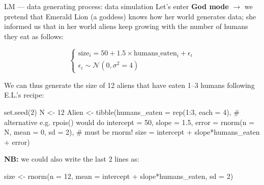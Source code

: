 \documentclass[
  10pt,
  ignorenonframetext,
  aspectratio=169,
  t]{beamer}
\newenvironment{Shaded}{\begin{snugshade}}{\end{snugshade}}
\newcommand{\AttributeTok}[1]{\textcolor[rgb]{0.40,0.45,0.13}{#1}}
\newcommand{\CommentTok}[1]{\textcolor[rgb]{0.37,0.37,0.37}{#1}}
\newcommand{\DecValTok}[1]{\textcolor[rgb]{0.68,0.00,0.00}{#1}}
\newcommand{\FloatTok}[1]{\textcolor[rgb]{0.68,0.00,0.00}{#1}}
\newcommand{\FunctionTok}[1]{\textcolor[rgb]{0.28,0.35,0.67}{#1}}
\newcommand{\NormalTok}[1]{\textcolor[rgb]{0.00,0.23,0.31}{#1}}
\newcommand{\OtherTok}[1]{\textcolor[rgb]{0.00,0.23,0.31}{#1}}
\newcommand{\SpecialCharTok}[1]{\textcolor[rgb]{0.37,0.37,0.37}{#1}}
\newcommand{\bluenorm}[1]{\textcolor{bluebeamer}{#1}}
\newcommand{\bluebold}[1]{\textcolor{bluebeamer}{\textbf{#1}}}
\begin{document}
\begin{frame}[fragile]{LM --- data generating process: data simulation}
\protect{}\label{lm-data-generating-process-data-simulation}
Let's enter \bluebold{God mode} \(\rightarrow\) we pretend that
\bluenorm{Emerald Lion} (a goddess) knows how her world generates data;
she informed us that in her world aliens keep growing with the number of
humans they eat as follows:

\begin{equation*}
\begin{cases}
\text{size}_i = 50 + 1.5 \times \text{humans\_eaten}_{i} + \epsilon_i \\
\epsilon_i \sim \mathcal{N}(0, \sigma^2 = 4)
\end{cases}
\end{equation*}

\pause

We can thus generate the size of 12 aliens that have eaten 1--3 humans
following E.L.'s recipe:

\footnotesize

\begin{Shaded}
\begin{Highlighting}[]
\FunctionTok{set.seed}\NormalTok{(}\DecValTok{2}\NormalTok{)}
\NormalTok{N }\OtherTok{\textless{}{-}} \DecValTok{12}
\NormalTok{Alien }\OtherTok{\textless{}{-}} \FunctionTok{tibble}\NormalTok{(}\AttributeTok{humans\_eaten =} \FunctionTok{rep}\NormalTok{(}\DecValTok{1}\SpecialCharTok{:}\DecValTok{3}\NormalTok{, }\AttributeTok{each =} \DecValTok{4}\NormalTok{), }\CommentTok{\# alternative e.g. rpois() would do }
                \AttributeTok{intercept =} \DecValTok{50}\NormalTok{, }\AttributeTok{slope =} \FloatTok{1.5}\NormalTok{,}
                \AttributeTok{error =} \FunctionTok{rnorm}\NormalTok{(}\AttributeTok{n =}\NormalTok{ N, }\AttributeTok{mean =} \DecValTok{0}\NormalTok{, }\AttributeTok{sd =} \DecValTok{2}\NormalTok{), }\CommentTok{\# must be rnorm!}
                \AttributeTok{size =}\NormalTok{ intercept }\SpecialCharTok{+}\NormalTok{ slope}\SpecialCharTok{*}\NormalTok{humans\_eaten }\SpecialCharTok{+}\NormalTok{ error)}
\end{Highlighting}
\end{Shaded}

\normalsize

\pause

\textbf{NB:} we could also write the last 2 lines as:

\footnotesize

\begin{Shaded}
\begin{Highlighting}[]
\NormalTok{size }\OtherTok{\textless{}{-}} \FunctionTok{rnorm}\NormalTok{(}\AttributeTok{n =} \DecValTok{12}\NormalTok{, }\AttributeTok{mean =}\NormalTok{ intercept }\SpecialCharTok{+}\NormalTok{ slope}\SpecialCharTok{*}\NormalTok{humans\_eaten, }\AttributeTok{sd =} \DecValTok{2}\NormalTok{)}
\end{Highlighting}
\end{Shaded}

\normalsize
\end{frame}
\end{document}
